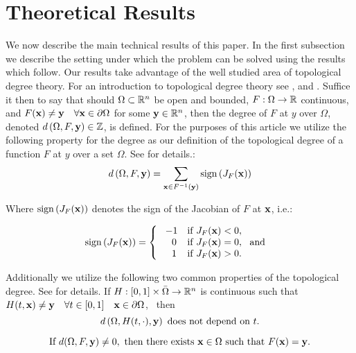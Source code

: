 \section{Theoretical Results} \label{sec:theory}  

We now describe the main technical results of this paper. 
In the first subsection we describe the setting under which the problem can be solved using the results which follow. Our results take advantage of the well studied area of topological degree theory. 
For an introduction to topological degree theory see \cite{OrChCh2006}, \cite{fonseca1995degree} and \cite{MoVrYa2002}. 
Suffice it then to say that should $\Omega\subset\mathbb{R}^{n}$ be open and bounded, $F:\Omega\rightarrow \mathbb{R}$ continuous, and $F(\mathbf{x}) \neq \mathbf{y} \quad \forall \mathbf{x}\in\partial\Omega$ for some $\mathbf{y}\in\mathbb{R}^n$, then the degree of $F$ at $y$ over $\Omega$, denoted $d\left(\Omega,F,\mathbf{y}\right)\in\mathbb{Z}$, is defined. 
For the purposes of this article we utilize the following property for the degree as our definition of the topological degree of a function $F$ at $y$ over a set $\Omega$. 
See \cite{OrChCh2006} for details.:
\begin{equation}\label{eq:Deg3}
d\left(\Omega,F,\mathbf{y}\right)=\sum\limits_{\mathbf{x}\in F^{-1}(\mathbf{y})}\operatorname{sign}\left(J_F(\mathbf{x})\right)
\end{equation}

Where $\operatorname{sign}\left(J_F(\mathbf{x})\right)$ denotes the sign of the Jacobian of $F$ at $\mathbf{x}$, i.e.:

\[\operatorname{sign}\left(J_F(\mathbf{x})\right)=   \left\{
\begin{array}{ll}
       \ -1   & \mbox{if } J_F(\mathbf{x})< 0, \\
      \quad 0 & \mbox{if } J_F(\mathbf{x})= 0,~\mbox{ and } \\
      \quad 1 & \mbox{if } J_F(\mathbf{x})> 0. \\
\end{array} 
\right. \]

Additionally we utilize the following two common properties of the topological degree. 
See \cite{OrChCh2006} for details. 
If $H : [0,1]\times\bar{\Omega}\rightarrow\mathbb{R}^n$ is continuous such that $H(t,\mathbf{x})\neq \mathbf{y} \quad \forall t\in[0,1]\quad \mathbf{x}\in\partial\Omega$,   \ then 
\begin{equation}\label{eq:Deg1} 
d\left(\Omega,H(t,\cdot),\mathbf{y}\right)\text{ does not depend on }t.
\end{equation}

\begin{equation}\label{eq:Deg2}
\text{If }d(\Omega,F,\mathbf{y})\neq 0,\text{ then there exists }\mathbf{x}\in\Omega\text{ such that }F(\mathbf{x})=\mathbf{y}. 
\end{equation}


